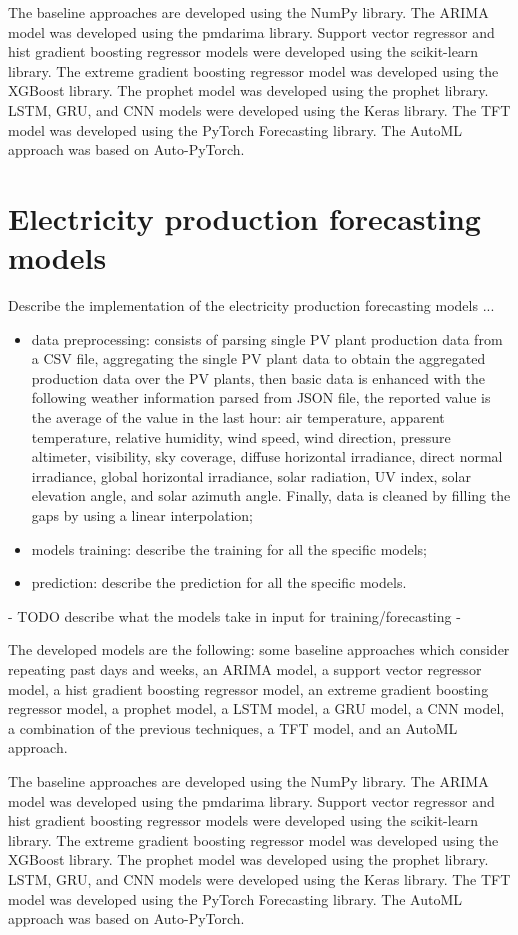 The baseline approaches are developed using the NumPy library.
The ARIMA model was developed using the pmdarima library.
Support vector regressor and hist gradient boosting regressor models were developed using the scikit-learn library.
The extreme gradient boosting regressor model was developed using the XGBoost library.
The prophet model was developed using the prophet library.
LSTM, GRU, and CNN models were developed using the Keras library.
The TFT model was developed using the PyTorch Forecasting library.
The AutoML approach was based on Auto-PyTorch.


\section{Electricity production forecasting models}
\label{sec:productionimpl}
\vspace{0.2 cm}

Describe the implementation of the electricity production forecasting models ...
\begin{itemize}
  \item data preprocessing: consists of parsing single PV plant production data from a CSV file, aggregating the single PV plant data to obtain the aggregated production data over the PV plants, then basic data is enhanced with the following weather information parsed from JSON file, the reported value is the average of the value in the last hour: air temperature, apparent temperature, relative humidity, wind speed, wind direction, pressure altimeter, visibility, sky coverage, diffuse horizontal irradiance, direct normal irradiance, global horizontal irradiance, solar radiation, UV index, solar elevation angle, and solar azimuth angle. Finally, data is cleaned by filling the gaps by using a linear interpolation;
  \item models training: describe the training for all the specific models;
  \item prediction: describe the prediction for all the specific models.
\end{itemize}


 - TODO describe what the models take in input for training/forecasting -


The developed models are the following: some baseline approaches which consider repeating past days and weeks, an ARIMA model, a support vector regressor model, a hist gradient boosting regressor model, an extreme gradient boosting regressor model, a prophet model, a LSTM model, a GRU model, a CNN model, a combination of the previous techniques, a TFT model, and an AutoML approach.

The baseline approaches are developed using the NumPy library.
The ARIMA model was developed using the pmdarima library.
Support vector regressor and hist gradient boosting regressor models were developed using the scikit-learn library.
The extreme gradient boosting regressor model was developed using the XGBoost library.
The prophet model was developed using the prophet library.
LSTM, GRU, and CNN models were developed using the Keras library.
The TFT model was developed using the PyTorch Forecasting library.
The AutoML approach was based on Auto-PyTorch.
